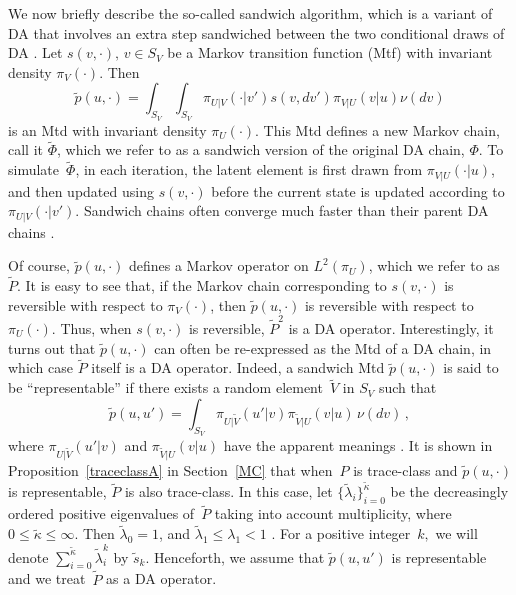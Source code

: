 \documentclass[11pt]{article}
\begin{document}
        We now briefly describe the so-called sandwich algorithm,
        which is a variant of DA that involves an extra step
        sandwiched between the two conditional draws of DA
        \citep{liu1999parameter,hobert2008theoretical}.  Let
        $s(v,\cdot), \, v \in S_V$ be a Markov transition function
        (Mtf) with invariant density $\pi_V(\cdot)$. Then
	\begin{equation} \label{sandwich} \tilde{p}(u,\cdot) =
          \int_{S_V}\int_{S_V} \pi_{U|V}(\cdot|v') s(v,dv')
          \pi_{V|U}(v|u) \nu(dv)
	\end{equation}
	is an Mtd with invariant density $\pi_U(\cdot)$.  This Mtd
        defines a new Markov chain, call it $\tilde{\Phi}$, which we
        refer to as a sandwich version of the original DA chain,
        $\Phi$.  To simulate~$\tilde{\Phi}$, in each iteration, the
        latent element is first drawn from $\pi_{V|U}(\cdot|u)$, and
        then updated using $s(v,\cdot)$ before the current state is
        updated according to $\pi_{U|V}(\cdot|v')$.  Sandwich chains
        often converge much faster than their parent DA chains
        \citep[see e.g.][]{khare2011spectral}.

        Of course, $\tilde{p}(u,\cdot)$ defines a Markov operator on
        $L^2(\pi_U)$, which we refer to as~$\tilde{P}$.  It is easy to
        see that, if the Markov chain corresponding to $s(v,\cdot)$ is
        reversible with respect to $\pi_V(\cdot)$, then
        $\tilde{p}(u,\cdot)$ is reversible with respect to
        $\pi_U(\cdot)$.  Thus, when $s(v,\cdot)$ is reversible,
        $\tilde{P}^2$ is a DA operator.  Interestingly, it turns out
        that $\tilde{p}(u,\cdot)$ can often be re-expressed as the Mtd
        of a DA chain, in which case $\tilde{P}$ itself is a DA
        operator.  Indeed, a sandwich Mtd $\tilde{p}(u,\cdot)$ is said
        to be ``representable'' if there exists a random
        element~$\tilde{V}$ in $S_V$ such that
	\begin{equation} \label{representable} \tilde{p}(u,u') =
          \int_{S_V} \pi_{U|\tilde{V}}(u'|v) \pi_{\tilde{V}|U}(v|u) \,
          \nu(dv) \,,
	\end{equation}
	where $\pi_{U|\tilde{V}}(u'|v)$ and $\pi_{\tilde{V}|U}(v|u)$
        have the apparent meanings \citep[see, e.g.][]{hobe:2011}.  It
        is shown in Proposition~\ref{traceclassA} in Section~\ref{MC}
        that when~$P$ is trace-class and $\tilde{p}(u,\cdot)$ is
        representable, $\tilde{P}$ is also trace-class.  In this case,
        let $\{\tilde{\lambda}_i\}_{i=0}^{\tilde{\kappa}}$ be the
        decreasingly ordered positive eigenvalues of~$\tilde{P}$ taking into
        account multiplicity, where $0 \leq \tilde{\kappa} \leq
        \infty$.  Then $\tilde{\lambda}_0 = 1$, and $\tilde{\lambda}_1
        \leq \lambda_1 < 1$ \citep{hobert2008theoretical}.  For a
        positive integer~$k,$ we will denote
        $\sum_{i=0}^{\tilde{\kappa}} \tilde{\lambda}_i^k$ by
        $\tilde{s}_k$.  Henceforth, we assume that $\tilde{p}(u,u')$
        is representable and we treat~$\tilde{P}$ as a DA operator.
	
\end{document}
